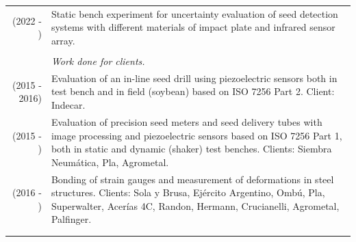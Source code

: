 \documentclass[a4paper,10pt, sans]{article}
\begin{document}
  \begin{table}[H]
  \centering
  \begin{tabularx}{\textwidth}{r X}  
  		(2022 - ) & Static bench experiment for uncertainty evaluation of seed detection systems with different materials of impact plate and infrared sensor array.\\ \\
        {} & \hspace{2cm} \textit{Work done for clients.} \\ [1ex]
        (2015 - 2016) & Evaluation of an in-line seed drill using piezoelectric sensors both in test bench and in field (soybean) based on ISO 7256 Part 2. Client: Indecar. \\  [1ex]

        (2015 - ) & Evaluation of precision seed meters and seed delivery tubes with image processing and piezoelectric sensors based on ISO 7256 Part 1, both in static and dynamic (shaker) test benches. Clients: Siembra Neumática, Pla, Agrometal. \\ [1ex]
        (2016 - ) & Bonding of strain gauges and measurement of deformations in steel structures. Clients: Sola y Brusa, Ejército Argentino, Ombú, Pla, Superwalter, Acerías 4C, Randon, Hermann, Crucianelli, Agrometal, Palfinger. \\ \\ \hline \\


\end{tabularx}
\end{table}
\end{document}
